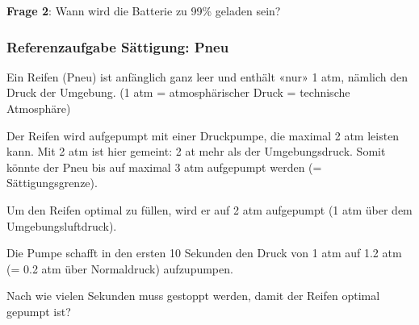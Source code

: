 \textbf{Frage 2}: Wann wird die Batterie zu 99\% geladen sein?

\newpage

\subsubsection{Referenzaufgabe Sättigung: Pneu}

Ein Reifen (Pneu) ist anfänglich ganz leer und enthält «nur» 1 atm, nämlich den
Druck der Umgebung. (1 atm = atmosphärischer Druck = technische Atmosphäre) 

Der Reifen wird aufgepumpt mit einer Druckpumpe, die maximal 2 atm
leisten
kann. Mit 2 atm ist hier gemeint: 2 at mehr als der
Umgebungsdruck. Somit könnte der Pneu bis auf maximal 3 atm aufgepumpt
werden (= Sättigungsgrenze).

Um den Reifen optimal zu füllen, wird er auf 2 atm aufgepumpt (1 atm
über dem Umgebungsluftdruck).

Die Pumpe schafft in den ersten 10 Sekunden den Druck von 1 atm auf 1.2
atm (= 0.2 atm über Normaldruck) aufzupumpen.

Nach wie vielen Sekunden muss gestoppt werden, damit der Reifen
optimal gepumpt ist?

\newpage


